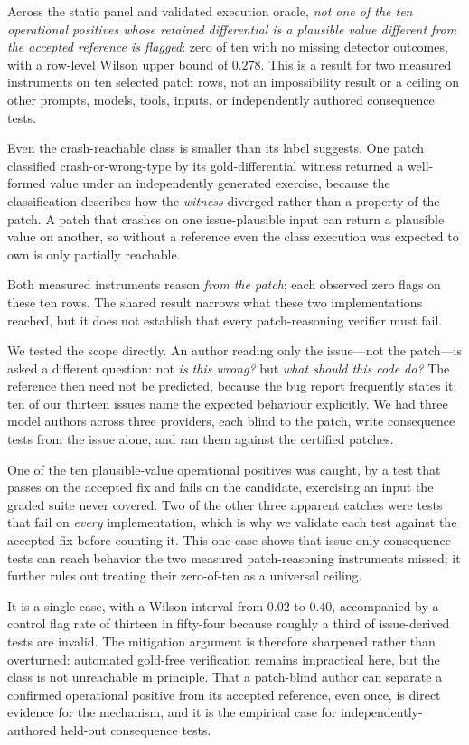 \documentclass[11pt]{article}
\begin{document}
Across the static panel and validated execution oracle, \emph{not one of the ten operational positives whose
retained differential is a plausible value different from the accepted reference is flagged}: zero of ten with no missing detector outcomes,
with a row-level Wilson upper bound of $0.278$. This is a result for two measured instruments on ten selected
patch rows, not an impossibility result or a ceiling on other prompts, models, tools, inputs, or independently
authored consequence tests.

Even the crash-reachable class is smaller than its label suggests. One patch classified crash-or-wrong-type by
its gold-differential witness returned a well-formed value under an independently generated exercise, because
the classification describes how the \emph{witness} diverged rather than a property of the patch. A patch that
crashes on one issue-plausible input can return a plausible value on another, so without a reference even the
class execution was expected to own is only partially reachable.

Both measured instruments reason \emph{from the patch}; each observed zero flags on these ten rows. The shared
result narrows what these two implementations reached, but it does not establish that every patch-reasoning
verifier must fail.

We tested the scope directly. An author reading only the issue---not
the patch---is asked a different question: not \emph{is this wrong?} but \emph{what should this code do?} The
reference then need not be predicted, because the bug report frequently states it; ten of our thirteen issues
name the expected behaviour explicitly. We had three model authors across three providers, each blind to the
patch, write consequence tests from the issue alone, and ran them against the certified patches.

One of the ten plausible-value operational positives was caught, by a test that passes on the accepted fix and
fails on the candidate, exercising an input the graded suite never covered. Two of the other three apparent
catches were tests that fail on \emph{every} implementation, which is why we validate each test against the
accepted fix before counting it. This one case shows that issue-only consequence tests can reach behavior the
two measured patch-reasoning instruments missed; it further rules out treating their zero-of-ten as a universal
ceiling.

It is a single case, with a Wilson interval from $0.02$ to $0.40$, accompanied by a control flag rate of
thirteen in fifty-four because roughly a third of issue-derived tests are invalid. The
mitigation argument is therefore sharpened rather than overturned: automated gold-free verification remains
impractical here, but the class is not unreachable in principle. That a patch-blind author can separate a
confirmed operational positive from its accepted reference, even once, is direct evidence for the mechanism, and it is
the
empirical case for independently-authored held-out consequence tests.
\end{document}
